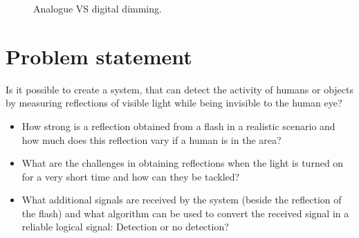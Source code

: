 \begin{figure}[h]
	\centering     %
	\label{fig:Introduction}
	\caption{Analogue VS digital dimming.}
\end{figure}

\section{Problem statement}
\label{Problem statement}
Is it possible to create a system, that can detect the activity of humans or objects by measuring reflections of visible light while being invisible to the human eye?
\begin{itemize}\itemsep2pt
	\item How strong is a reflection obtained from a flash in a realistic scenario and how much does this reflection vary if a human is in the area?
	\item What are the challenges in obtaining reflections when the light is turned on for a very short time and how can they be tackled?
	\item What additional signals are received by the system (beside the reflection of the flash) and what algorithm can be used to convert the received signal in a reliable logical signal: Detection or no detection?
\end{itemize}

